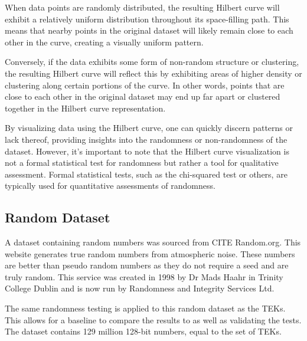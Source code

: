 When data points are randomly distributed, the resulting Hilbert curve will exhibit a relatively uniform distribution throughout its space-filling path. This means that nearby points in the original dataset will likely remain close to each other in the curve, creating a visually uniform pattern.

Conversely, if the data exhibits some form of non-random structure or clustering, the resulting Hilbert curve will reflect this by exhibiting areas of higher density or clustering along certain portions of the curve. In other words, points that are close to each other in the original dataset may end up far apart or clustered together in the Hilbert curve representation.

By visualizing data using the Hilbert curve, one can quickly discern patterns or lack thereof, providing insights into the randomness or non-randomness of the dataset. However, it's important to note that the Hilbert curve visualization is not a formal statistical test for randomness but rather a tool for qualitative assessment. Formal statistical tests, such as the chi-squared test or others, are typically used for quantitative assessments of randomness.

\subsection{Random Dataset}

A dataset containing random numbers was sourced from CITE Random.org. This website generates true random numbers from atmospheric noise. These numbers are better than pseudo random numbers as they do not require a seed and are truly random. This service was created in 1998 by Dr Mads Haahr in Trinity College Dublin and is now run by Randomness and Integrity Services Ltd. \newline

The same randomness testing is applied to this random dataset as the TEKs. This allows for a baseline to compare the results to as well as validating the tests.  The dataset contains 129 million 128-bit numbers, equal to the set of TEKs.

